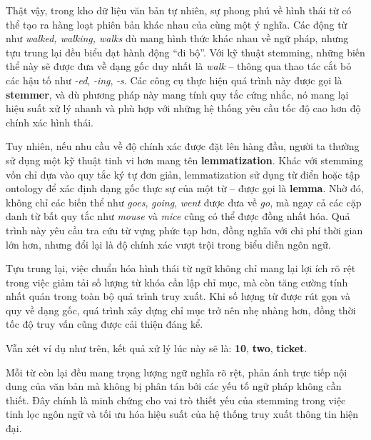 Thật vậy, trong kho dữ liệu văn bản tự nhiên, sự phong phú về hình thái từ có thể tạo ra hàng loạt phiên bản khác nhau của cùng một ý nghĩa. Các động từ như \textit{walked, walking, walks} dù mang hình thức khác nhau về ngữ pháp, nhưng tựu trung lại đều biểu đạt hành động ``đi bộ''. Với kỹ thuật stemming, những biến thể này sẽ được đưa về dạng gốc duy nhất là \textit{walk} -- thông qua thao tác cắt bỏ các hậu tố như \textit{-ed}, \textit{-ing}, \textit{-s}. Các công cụ thực hiện quá trình này được gọi là \textbf{stemmer}, và dù phương pháp này mang tính quy tắc cứng nhắc, nó mang lại hiệu suất xử lý nhanh và phù hợp với những hệ thống yêu cầu tốc độ cao hơn độ chính xác hình thái.

Tuy nhiên, nếu nhu cầu về độ chính xác được đặt lên hàng đầu, người ta thường sử dụng một kỹ thuật tinh vi hơn mang tên \textbf{lemmatization}. Khác với stemming vốn chỉ dựa vào quy tắc ký tự đơn giản, lemmatization sử dụng từ điển hoặc tập ontology để xác định dạng gốc thực sự của một từ -- được gọi là \textbf{lemma}. Nhờ đó, không chỉ các biến thể như \textit{goes}, \textit{going}, \textit{went} được đưa về \textit{go}, mà ngay cả các cặp danh từ bất quy tắc như \textit{mouse} và \textit{mice} cũng có thể được đồng nhất hóa. Quá trình này yêu cầu tra cứu từ vựng phức tạp hơn, đồng nghĩa với chi phí thời gian lớn hơn, nhưng đổi lại là độ chính xác vượt trội trong biểu diễn ngôn ngữ.

Tựu trung lại, việc chuẩn hóa hình thái từ ngữ không chỉ mang lại lợi ích rõ rệt trong việc giảm tải số lượng từ khóa cần lập chỉ mục, mà còn tăng cường tính nhất quán trong toàn bộ quá trình truy xuất. Khi số lượng từ được rút gọn và quy về dạng gốc, quá trình xây dựng chỉ mục trở nên nhẹ nhàng hơn, đồng thời tốc độ truy vấn cũng được cải thiện đáng kể.

Vẫn xét ví dụ như trên, kết quả xử lý lúc này sẽ là: \textbf{10}, \textbf{two}, \textbf{ticket}.

Mỗi từ còn lại đều mang trọng lượng ngữ nghĩa rõ rệt, phản ánh trực tiếp nội dung của văn bản mà không bị phân tán bởi các yếu tố ngữ pháp không cần thiết. Đây chính là minh chứng cho vai trò thiết yếu của stemming trong việc tinh lọc ngôn ngữ và tối ưu hóa hiệu suất của hệ thống truy xuất thông tin hiện đại.
